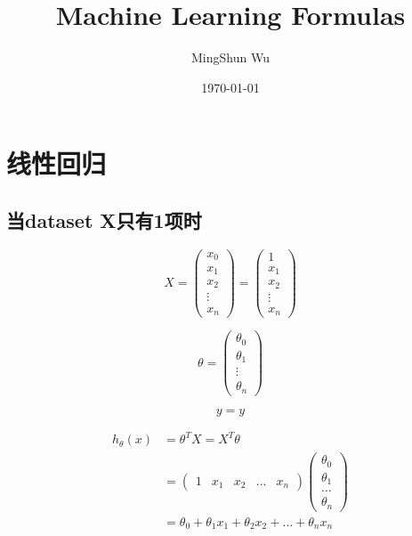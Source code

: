 \documentclass[12pt]{article}   %
\title{Machine Learning Formulas}
\author{MingShun Wu}
\date{\today}
\begin{document}
\maketitle
\tableofcontents
\setcounter{tocdepth}{2}

\section{线性回归}
\subsection{当dataset X只有1项时}
\begin{equation}
X = 
	\left(
		\begin{matrix}
			x_0 \\
			x_1 \\
			x_2 \\
			\vdots \\
			x_n
		\end{matrix}
	\right) 
= 
  	\left(
		\begin{matrix}
			1 \\
			x_1 \\
			x_2 \\
			\vdots \\
			x_n
		\end{matrix}
	\right)
\end{equation}

\begin{equation}
\theta = 
	\left(
		\begin{matrix}
			\theta_0 \\
			\theta_1 \\
			\vdots \\
			\theta_n
		\end{matrix}
	\right)
\end{equation}

\begin{equation}
y = y
\end{equation}

\begin{equation}
\begin{aligned}
	h_{\theta}(x) & = \theta^{T}X = X^T\theta \\
	& = 
		\left(
			\begin{matrix}
				1 & x_1 & x_2 & \dots & x_n
			\end{matrix}
		\right)
		\left(
			\begin{matrix}
			\theta_0 \\
			\theta_1 \\
			\dots \\
			\theta_n
			\end{matrix}
		\right) \\
	& = \theta_0 + \theta_1x_1 + \theta_2x_2 + \dots + \theta_nx_n
\end{aligned}
\end{equation}
\end{document}
